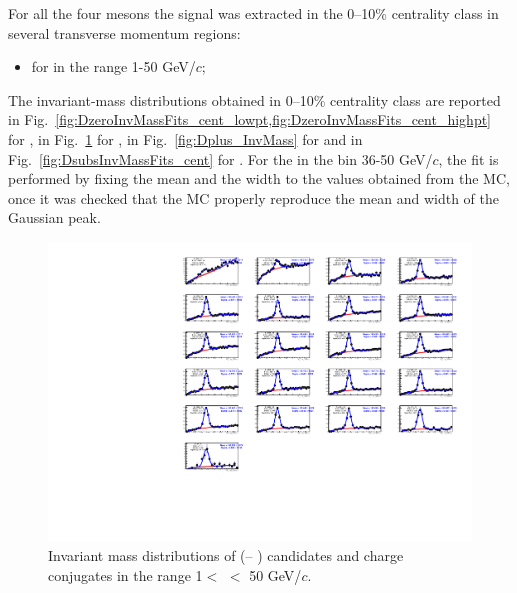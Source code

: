 For all the four mesons the signal was extracted in the 0--10$\%$ centrality class in several transverse momentum regions: 
\begin{itemize}
	\item for \Dstar in the range 1-50 GeV/$c$;
\end{itemize} 
The invariant-mass distributions obtained in 0--10$\%$ centrality class are reported in Fig.~\ref{fig:DzeroInvMassFits_cent_lowpt,fig:DzeroInvMassFits_cent_highpt} for \Dzero, in Fig.~\ref{fig:Dstar_InvMass} for \Dstar, in Fig.~\ref{fig:Dplus_InvMass}  for \Dplus and in Fig.~\ref{fig:DsubsInvMassFits_cent} for \Dsubs. For the \Dzero in the \pt bin 36-50 GeV/$c$, the fit is performed by fixing the mean  and the width to the values obtained from the MC, once it was checked that the MC properly reproduce the mean and width of the \Dzero Gaussian peak.



\begin{figure}[tb]
\begin{center}
 \includegraphics[width=1\textwidth]{figures/Dstar/pp13TeV/DstarInvMass_new.pdf}
\caption{Invariant mass distributions of  (\Dstar -- \Dzero) candidates and charge conjugates in the range 1$<$ \pt$<$ 50 GeV/$c$.}
\label{fig:Dstar_InvMass}
\end{center}
\end{figure}



